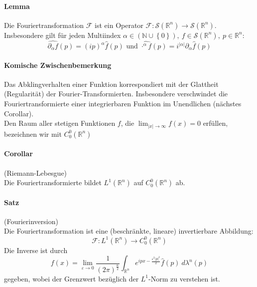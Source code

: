\documentclass[12pt,a4paper,fleqn]{article}
\def\abs#1{{\left\vert #1 \right\vert}}
\def\set#1{{\left\{ #1 \right\}}}
\def\R{{\mathbb{R}}}
\begin{document}
\paragraph{Lemma} Die Fouriertransformation $\mathscr{F}$ ist ein Operator $\mathscr{F}\colon \mathscr{S}(\R^n) \rightarrow \mathscr{S}(\R^n)$. Insbesondere gilt für jeden Multiindex $\alpha \in (\mathbb{N} \cup \set{0}),\ f \in \mathscr{S}(\R^n),\ p \in \R^n$:
\begin{displaymath}
\widehat{\partial_\alpha f}(p) = (ip)^\alpha \widehat{f}(p) \text{ und } \widehat{\cdot^\alpha f}(p) = i^{\abs{\alpha}}\partial_\alpha\widehat{f}(p)
\end{displaymath}

\paragraph{Komische Zwischenbemerkung} Das Abklingverhalten einer Funktion korrespondiert mit der Glattheit (Regularität) der Fourier-Transformierten. Insbesondere verschwindet die Fouriertransformierte einer integrierbaren Funktion im Unendlichen (nächstes Corollar).\\
Den Raum aller stetigen Funktionen $f$, die $\lim_{\abs{x} \rightarrow \infty} f(x) = 0$ erfüllen, bezeichnen wir mit $C^0_0(\R^n)$

\paragraph{Corollar} (Riemann-Lebesgue)\\
Die Fouriertransformierte bildet $L^1(\R^n)$ auf $C^0_0(\R^n)$ ab.

\paragraph{Satz} (Fourierinversion)\\
Die Fouriertransformation ist eine (beschränkte, lineare) invertierbare Abbildung:
\begin{displaymath}
\mathscr{F}: L^1(\R^n) \rightarrow C^0_0(\R^n)
\end{displaymath}
Die Inverse ist durch
\begin{displaymath}
f(x) = \lim_{\varepsilon\rightarrow 0} \frac{1}{(2\pi)^\frac{n}{2}} \int_{\R^n} e^{ipx-\frac{\varepsilon^2\abs{p}^2}{2}}\widehat{f}(p)\ d\lambda^n(p)
\end{displaymath}
gegeben, wobei der Grenzwert bezüglich der $L^1$-Norm zu verstehen ist.
\end{document}
